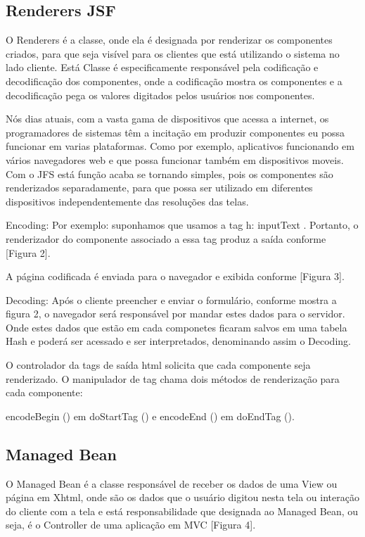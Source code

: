 \documentclass[	DIV=calc,%
							paper=a4,%
							fontsize=12pt,%
							onecolumn]{scrartcl}	 					%
\begin{document}
\subsection{Renderers JSF}

O Renderers é a classe, onde ela é designada por renderizar os componentes criados, para que seja visível para os clientes que está utilizando o sistema no lado cliente. Está Classe é especificamente responsável pela codificação e decodificação dos componentes, onde a codificação mostra os componentes e a decodificação pega os valores digitados pelos usuários nos componentes.

Nós dias atuais, com a vasta gama de dispositivos que acessa a internet, os programadores de sistemas têm a incitação em produzir componentes eu possa funcionar em varias plataformas. Como por exemplo, aplicativos funcionando em vários navegadores web e que possa funcionar também em dispositivos moveis. Com o JFS está função acaba se tornando simples, pois os componentes são renderizados separadamente, para que possa ser utilizado em diferentes dispositivos independentemente das resoluções das telas.

Encoding: Por exemplo: suponhamos que usamos a tag h: inputText . 
Portanto, o renderizador do componente associado a essa tag produz a saída conforme [Figura 2].

A página codificada é enviada para o navegador e exibida conforme [Figura 3].

Decoding: Após o cliente preencher e enviar o formulário, conforme mostra a figura 2, o navegador será responsável por mandar estes dados para o servidor. Onde estes dados que estão em cada componetes ficaram salvos em uma tabela Hash e poderá ser acessado e ser interpretados, denominando assim o Decoding.

O controlador da tags de saída html solicita que cada componente seja renderizado. O manipulador de tag chama dois métodos de renderização para cada componente:

encodeBegin () em doStartTag ()    e  encodeEnd () em   doEndTag (). 

\subsection{Managed Bean}

O Managed Bean é a classe responsável de receber os dados de uma View ou página em Xhtml, onde são os dados que o usuário digitou nesta tela ou interação do cliente com a tela e está responsabilidade que designada ao Managed Bean, ou seja, é o Controller de uma aplicação em MVC [Figura 4].
\end{document}
